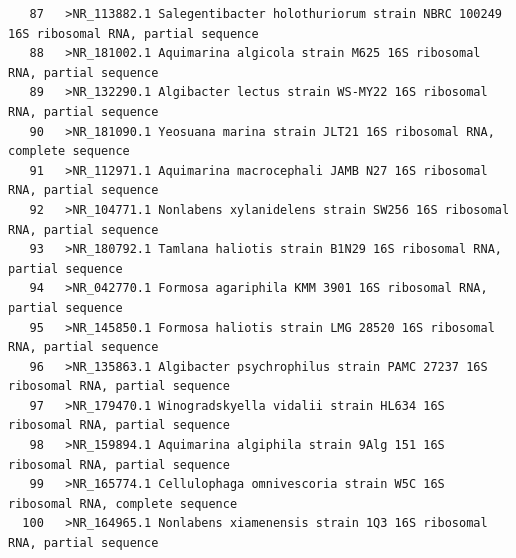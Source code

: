\documentclass{article}
\begin{document}
\begin{verbatim}
   87	>NR_113882.1 Salegentibacter holothuriorum strain NBRC 100249 16S ribosomal RNA, partial sequence
   88	>NR_181002.1 Aquimarina algicola strain M625 16S ribosomal RNA, partial sequence
   89	>NR_132290.1 Algibacter lectus strain WS-MY22 16S ribosomal RNA, partial sequence
   90	>NR_181090.1 Yeosuana marina strain JLT21 16S ribosomal RNA, complete sequence
   91	>NR_112971.1 Aquimarina macrocephali JAMB N27 16S ribosomal RNA, partial sequence
   92	>NR_104771.1 Nonlabens xylanidelens strain SW256 16S ribosomal RNA, partial sequence
   93	>NR_180792.1 Tamlana haliotis strain B1N29 16S ribosomal RNA, partial sequence
   94	>NR_042770.1 Formosa agariphila KMM 3901 16S ribosomal RNA, partial sequence
   95	>NR_145850.1 Formosa haliotis strain LMG 28520 16S ribosomal RNA, partial sequence
   96	>NR_135863.1 Algibacter psychrophilus strain PAMC 27237 16S ribosomal RNA, partial sequence
   97	>NR_179470.1 Winogradskyella vidalii strain HL634 16S ribosomal RNA, partial sequence
   98	>NR_159894.1 Aquimarina algiphila strain 9Alg 151 16S ribosomal RNA, partial sequence
   99	>NR_165774.1 Cellulophaga omnivescoria strain W5C 16S ribosomal RNA, complete sequence
  100	>NR_164965.1 Nonlabens xiamenensis strain 1Q3 16S ribosomal RNA, partial sequence
\end{verbatim}
\end{document}
